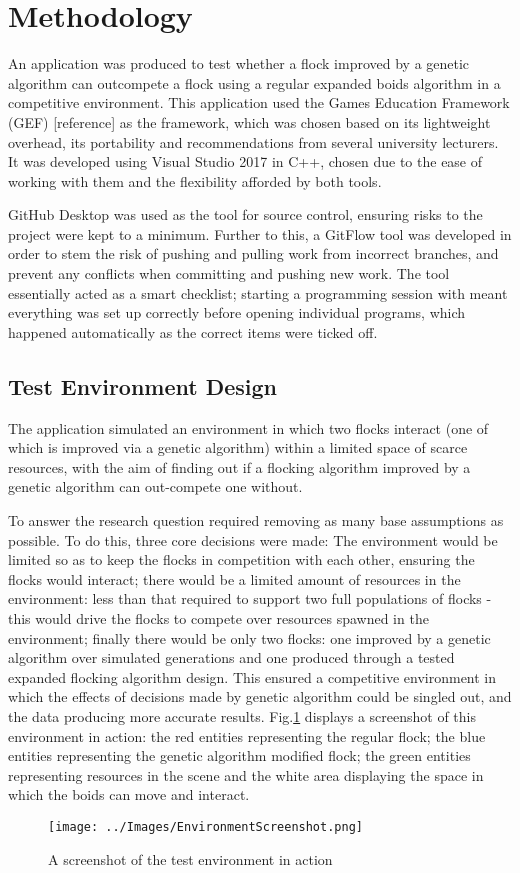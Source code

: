 \section{Methodology}
An application was produced to test whether a flock improved by a genetic algorithm can outcompete a flock using a regular expanded boids algorithm in a competitive environment. This application used the Games Education Framework (GEF) [reference] as the framework, which was chosen based on its lightweight overhead, its portability and recommendations from several university lecturers. It was developed using Visual Studio 2017 in C++, chosen due to the ease of working with them and the flexibility afforded by both tools.

GitHub Desktop was used as the tool for source control, ensuring risks to the project were kept to a minimum. Further to this, a GitFlow tool was developed in order to stem the risk of pushing and pulling work from incorrect branches, and prevent any conflicts when committing and pushing new work. The tool essentially acted as a smart checklist; starting a programming session with meant everything was set up correctly before opening individual programs, which happened automatically as the correct items were ticked off.


\subsection{Test Environment Design}
The application simulated an environment in which two flocks interact (one of which is improved via a genetic algorithm) within a limited space of scarce resources, with the aim of finding out if a flocking algorithm improved by a genetic algorithm can out-compete one without.

To answer the research question required removing as many base assumptions as possible. To do this, three core decisions were made: The environment would be limited so as to keep the flocks in competition with each other, ensuring the flocks would interact; there would be a limited amount of resources in the environment: less than that required to support two full populations of flocks - this would drive the flocks to compete over resources spawned in the environment; finally there would be only two flocks: one improved by a genetic algorithm over simulated generations and one produced through a tested expanded flocking algorithm design. This ensured a competitive environment in which the effects of decisions made by genetic algorithm could be singled out, and the data producing more accurate results. Fig.\ref{fig:EnvScrnshot} displays a screenshot of this environment in action: the red entities representing the regular flock; the blue entities representing the genetic algorithm modified flock; the green entities representing resources in the scene and the white area displaying the space in which the boids can move and interact.
\begin{figure}[H]
	\texttt{[image: ../Images/EnvironmentScreenshot.png]}
	\caption{A screenshot of the test environment in action}
	\label{fig:EnvScrnshot}
\end{figure}


